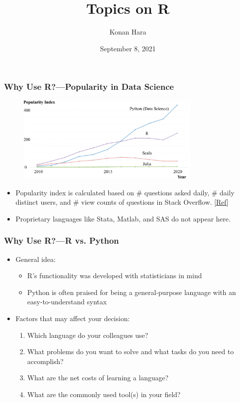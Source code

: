\documentclass[aspectratio=169, 12pt]{beamer}
\title[Topics on R]{Topics on R}
\author[Konan Hara]{Konan Hara}
\institute[Arizona]{University of Arizona}
\date{September 8, 2021}
\begin{document}
	\begin{frame}[plain]
	\titlepage
	\end{frame}

	\begin{frame}
	\frametitle{Why Use R?---Popularity in Data Science}
	\begin{figure}
	\includegraphics[width=0.8\textwidth]{fig/Popularity_Ranking_Programming_Languages_Data_Science-crop.pdf}
	\end{figure}
	\vspace*{-10pt}
	\begin{itemize}
	\item Popularity index is calculated based on \# questions asked daily, \# daily distinct users, and \# view counts of questions in Stack Overflow. [\href{https://towardsdatascience.com/popularity-ranking-of-programming-languages-72bcf697ea20}{\underline{Ref}}]
	\item Proprietary languages like Stata, Matlab, and SAS do not appear here.
	\end{itemize}

	\end{frame}

	\begin{frame}
	\frametitle{Why Use R?---R vs. Python}
	\begin{itemize}
	\item General idea:
	\begin{itemize}
	\item R's functionality was developed with statisticians in mind
	\item Python is often praised for being a general-purpose language with an easy-to-understand syntax
	\end{itemize}
	\item Factors that may affect your decision:
	\begin{enumerate}
	\item Which language do your colleagues use?
	\item What problems do you want to solve and what tasks do you need to accomplish?
	\item What are the net costs of learning a language?
	\item What are the commonly used tool(s) in your field?
	\end{enumerate}
	\end{itemize}

	\end{frame}
\end{document}
